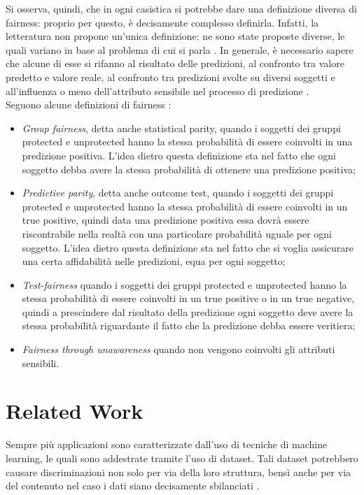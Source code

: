 Si osserva, quindi, che in ogni casistica si potrebbe dare una definizione diversa di fairness: proprio per questo, è decisamente complesso definirla. Infatti, la letteratura non propone un'unica definizione: ne sono state proposte diverse, le quali variano in base al problema di cui si parla \cite{islam2021through}. In generale, è necessario sapere che alcune di esse si rifanno al risultato delle predizioni, al confronto tra valore predetto e valore reale, al confronto tra predizioni svolte su diversi soggetti e all'influenza o meno dell'attributo sensibile nel processo di predizione \cite{verma2018fairness}.\\
Seguono alcune definizioni di fairness \cite{verma2018fairness}:
\begin{itemize}
  \item \emph{Group fairness}, detta anche statistical parity, quando i soggetti dei gruppi protected e unprotected hanno la stessa probabilità di essere coinvolti in una predizione positiva. L'idea dietro questa definizione sta nel fatto che ogni soggetto debba avere la stessa probabilità di ottenere una predizione positiva;
  \item \emph{Predictive parity}, detta anche outcome test, quando i soggetti dei gruppi protected e unprotected hanno la stessa probabilità di essere coinvolti in un true positive, quindi data una predizione positiva essa dovrà essere riscontrabile nella realtà con una particolare probabilità uguale per ogni soggetto. L'idea dietro questa definizione sta nel fatto che si voglia assicurare una certa affidabilità nelle predizioni, equa per ogni soggetto;
  \item \emph{Test-fairness} quando i soggetti dei gruppi protected e unprotected hanno la stessa probabilità di essere coinvolti in un true positive o in un true negative, quindi a prescindere dal risultato della predizione ogni soggetto deve avere la stessa probabilità riguardante il fatto che la predizione debba essere veritiera;
  \item \emph{Fairness through unawareness} quando non vengono coinvolti gli attributi sensibili.
\end{itemize}

\section{Related Work}

Sempre più applicazioni sono caratterizzate dall'uso di tecniche di machine learning, le quali sono addestrate tramite l'uso di dataset. Tali dataset potrebbero causare discriminazioni non solo per via della loro struttura, bensì anche per via del contenuto nel caso i dati siano decisamente sbilanciati \cite{vasudevan2020lift}.

